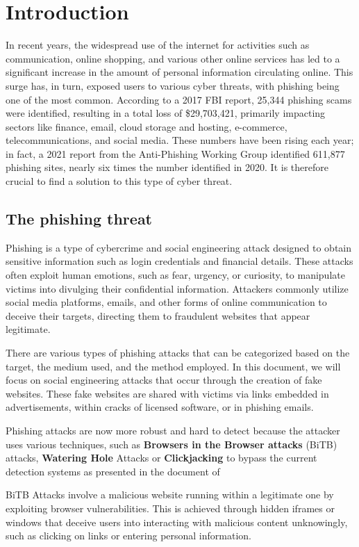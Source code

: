 \chapter{Introduction}
In recent years, the widespread use of the internet for activities such as communication, online shopping, and various other online services has led to a significant increase in the amount of personal information circulating online. This surge has, in turn, exposed users to various cyber threats, with phishing being one of the most common. According to a 2017 FBI report, 25,344 phishing scams were identified, resulting in a total loss of \$29,703,421, primarily impacting sectors like finance, email, cloud storage and hosting, e-commerce, telecommunications, and social media. These numbers have been rising each year; in fact, a 2021 report from the Anti-Phishing Working Group identified 611,877 phishing sites, nearly six times the number identified in 2020. It is therefore crucial to find a solution to this type of cyber threat.

\section{The phishing threat}
Phishing is a type of cybercrime and social engineering attack designed to obtain sensitive information such as login credentials and financial details. These attacks often exploit human emotions, such as fear, urgency, or curiosity, to manipulate victims into divulging their confidential information. Attackers commonly utilize social media platforms, emails, and other forms of online communication to deceive their targets, directing them to fraudulent websites that appear legitimate.

There are various types of phishing attacks that can be categorized based on the target, the medium used, and the method employed. In this document, we will focus on social engineering attacks that occur through the creation of fake websites. These fake websites are shared with victims via links embedded in advertisements, within cracks of licensed software, or in phishing emails.

Phishing attacks are now more robust and hard to detect because the attacker uses various techniques, such as \textbf{Browsers in the Browser attacks} (BiTB) attacks, \textbf{Watering Hole} Attacks or \textbf{Clickjacking} to bypass the current detection systems as presented in the document of \textcite{PhishTransformer}

BiTB Attacks involve a malicious website running within a legitimate one by exploiting browser vulnerabilities. This is achieved through hidden iframes or windows that deceive users into interacting with malicious content unknowingly, such as clicking on links or entering personal information.

